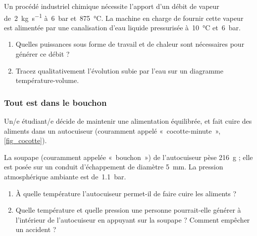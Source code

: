	Un procédé industriel chimique nécessite l’apport d’un débit de vapeur de~\SI{2}{\kilogram\per\second} à~\SI{6}{\bar} et~\SI{875}{\degreeCelsius}. La machine en charge de fournir cette vapeur est alimentée par une canalisation d’eau liquide pressurisée à~\SI{10}{\degreeCelsius} et~\SI{6}{\bar}.

	\begin{enumerate}
		\item Quelles puissances sous forme de travail et de chaleur sont nécessaires pour générer ce débit ?
		\item Tracez qualitativement l’évolution subie par l’eau sur un diagramme température-volume.
	\end{enumerate}


\subsubsection{Tout est dans le bouchon}
\label{exo_cocotteminute}

	Un/e étudiant/e décide de maintenir une alimentation équilibrée, et fait cuire des aliments dans un autocuiseur (couramment appelé «~cocotte-minute~», \cref{fig_cocotte}). 
		
	La soupape (couramment appelée «~bouchon~») de l’autocuiseur pèse \SI{216}{\gram} ; elle est posée sur un conduit d’échappement de diamètre \SI{5}{\milli\metre}. La pression atmosphérique ambiante est de~\SI{1,1}{\bar}.
	
	\begin{enumerate}
		\item À quelle température l’autocuiseur permet-il de faire cuire les aliments ?
		\item Quelle température et quelle pression une personne pourrait-elle générer à l’intérieur de l’autocuiseur en appuyant sur la soupape ? Comment empêcher un accident ?
	\end{enumerate}

